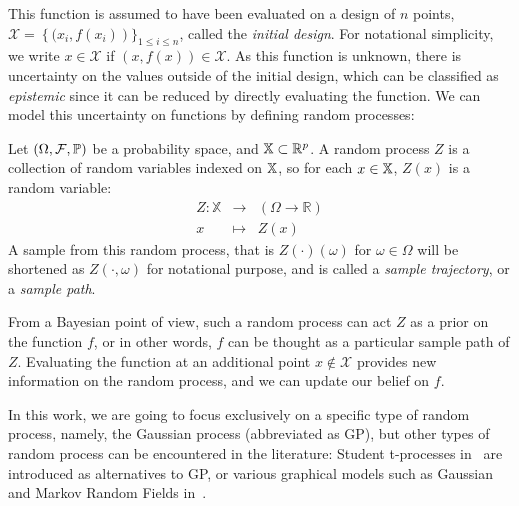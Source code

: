 \documentclass[../../Main_ManuscritThese.tex]{subfiles}
\begin{document}
This function is assumed to have been evaluated on a design of $n$ points, $\mathcal{X} = \left\{ (x_i, f(x_i) \right)\}_{1\leq i\leq n}$, called the \emph{initial design}. For notational simplicity, we write $x\in \mathcal{X}$ if $(x, f(x)) \in \mathcal{X}$.
As this function is unknown, there is uncertainty on the values outside of the initial design, which can be classified as \emph{epistemic} since it can be reduced by directly evaluating the function.
We can model this uncertainty on functions by defining random processes:
\begin{definition}
  Let $(\Omega, \mathcal{F}, \mathbb{P})$ be a probability space, and $\mathbb{X}\subset \mathbb{R}^p$.
  A random process $Z$ is a collection of random variables indexed on $\mathbb{X}$, so for each $x \in \mathbb{X}$, $Z(x)$ is a random variable:
 \begin{equation}
  \begin{array}{rcl}
    Z: \mathbb{X} & \longrightarrow & \left(\Omega \rightarrow \mathbb{R} \right)\\
    x& \longmapsto & Z(x)
  \end{array}
\end{equation}
A sample from this random process, that is $Z(\cdot)(\omega)$ for $\omega \in \Omega$ will be shortened as $Z(\cdot, \omega)$ for notational purpose, and is called a \emph{sample trajectory}, or a \emph{sample path}.
\end{definition}
From a Bayesian point of view, such a random process can act $Z$ as a prior on the function $f$, or in other words, $f$ can be thought as a particular sample path of $Z$.
Evaluating the function at an additional point $x \notin \mathcal{X}$ provides new information on the random process, and we can update our belief on $f$.


In this work, we are going to focus exclusively on a specific type of random process, namely, the Gaussian process (abbreviated as GP), but other types of random process can be encountered in the literature: Student t-processes in~\cite{shah_student-t_2014} are introduced as alternatives to GP, or various graphical models such as Gaussian and Markov Random Fields in~\cite{bishop_pattern_2006,li_markov_2009}.
\end{document}
